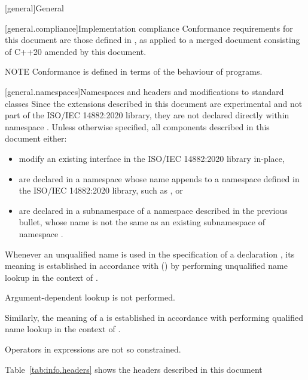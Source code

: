 [general]{General}

[general.compliance]{Implementation compliance}
Conformance requirements for this document are those defined in , as applied to a merged document consisting of C++20 amended by this document.

NOTE Conformance is defined in terms of the behaviour of programs.%

[general.namespaces]{Namespaces and headers and modifications to standard classes}
Since the extensions described in this document are experimental and not part of the ISO/IEC 14882:2020 library, they are not declared directly within namespace . Unless otherwise specified, all components described in this document either:

\begin{itemize}
    \item modify an existing interface in the ISO/IEC 14882:2020 library in-place,
    \item are declared in a namespace whose name appends  to a namespace defined in the ISO/IEC 14882:2020 library, such as , or
    \item are declared in a subnamespace of a namespace described in the previous bullet, whose name is not the same as an existing subnamespace of namespace .
\end{itemize}

Whenever an unqualified name is used
in the specification of a declaration ,
its meaning is established
in accordance with () by performing unqualified name lookup
in the context of .
\begin{note}
Argument-dependent lookup is not performed.\end{note}
Similarly, the meaning of a  is established
in accordance with performing qualified name lookup
in the context of .
\begin{note}
Operators in expressions are not so constrained.\end{note}

Table~\ref{tab:info.headers} shows the headers described in this document

